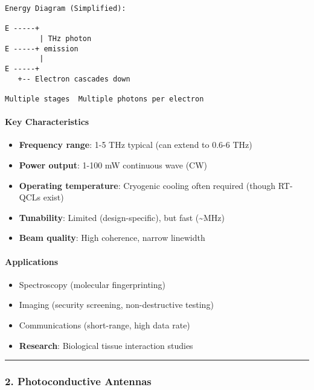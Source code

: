 \begin{verbatim}
Energy Diagram (Simplified):

E -----+
        | THz photon
E -----+ emission
        |
E -----+
   +-- Electron cascades down

Multiple stages  Multiple photons per electron
\end{verbatim}

\paragraph{Key Characteristics}\label{key-characteristics}

\begin{itemize}
\tightlist
\item
  \textbf{Frequency range}: 1-5 THz typical (can extend to 0.6-6 THz)
\item
  \textbf{Power output}: 1-100 mW continuous wave (CW)
\item
  \textbf{Operating temperature}: Cryogenic cooling often required
  (though RT-QCLs exist)
\item
  \textbf{Tunability}: Limited (design-specific), but fast
  (\textasciitilde MHz)
\item
  \textbf{Beam quality}: High coherence, narrow linewidth
\end{itemize}

\paragraph{Applications}\label{applications}

\begin{itemize}
\tightlist
\item
  Spectroscopy (molecular fingerprinting)
\item
  Imaging (security screening, non-destructive testing)
\item
  Communications (short-range, high data rate)
\item
  \textbf{Research}: Biological tissue interaction studies
\end{itemize}

\begin{center}\rule{0.5\linewidth}{0.5pt}\end{center}

\subsubsection{2. Photoconductive
Antennas}\label{photoconductive-antennas}


